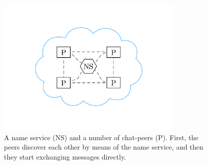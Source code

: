 \begin{figure}
  \centering
  \includegraphics[width=0.8\textwidth, clip=true, trim=0 180px 0 180px]{include/assets/chat.pdf}
  \caption{A name service (NS) and a number of chat-peers (P). First, the peers discover each other by means of the name service, and then they start exchanging messages directly.}
\end{figure}
